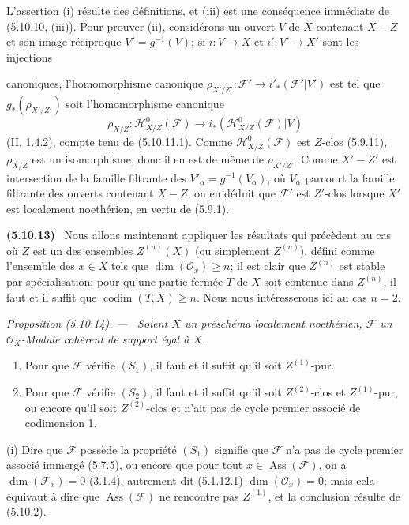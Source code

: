 \documentclass[10pt,oneside]{book}
\newcommand{\oldpage}[2][]{%
  \setcounter{footnote}{0}%
  \marginpar{\scriptsize\textbf{#1}~|~#2}\ignorespaces}
\newenvironment{env}[1][]{\par\medskip\noindent\textbf{(#1)}\ }{\par}
\newenvironment{proposition}[1][]{%
  \par\medskip\noindent\itshape Proposition (#1). ---\ }{\par}
\begin{document}
L'assertion (i) résulte des définitions, et (iii) est une conséquence immédiate
de (5.10.10, (iii)). Pour prouver (ii), considérons un ouvert $V$ de $X$
contenant $X-Z$ et son image réciproque $V'=g^{-1}(V)$; si $i:V\to X$ et
$i':V'\to X'$ sont les injections

\oldpage[IV-2]{119}

canoniques, l'homomorphisme canonique
$\rho_{X'/Z'}:\mathcal F'\to i'_*(\mathcal F'|V')$ est tel que
$g_*(\rho_{X'/Z'})$ soit l'homomorphisme canonique
\[
\rho_{X/Z}:\mathcal H^0_{X/Z}(\mathcal F)
\longrightarrow i_*(\mathcal H^0_{X/Z}(\mathcal F)|V)
\]
(II, 1.4.2), compte tenu de (5.10.11.1). Comme
$\mathcal H^0_{X/Z}(\mathcal F)$ est $Z$-clos (5.9.11), $\rho_{X/Z}$ est un
isomorphisme, donc il en est de même de $\rho_{X'/Z'}$. Comme $X'-Z'$ est
intersection de la famille filtrante des $V'_\alpha=g^{-1}(V_\alpha)$, où
$V_\alpha$ parcourt la famille filtrante des ouverts contenant $X-Z$, on en
déduit que $\mathcal F'$ est $Z'$-clos lorsque $X'$ est localement noethérien,
en vertu de (5.9.1).

\begin{env}[5.10.13]
\label{IV.2.s5.10.13-fr}
Nous allons maintenant appliquer les résultats qui précèdent au cas où $Z$ est
un des ensembles $Z^{(n)}(X)$ (ou simplement $Z^{(n)}$), défini comme
l'ensemble des $x\in X$ tels que $\dim(\mathcal O_x)\geq n$; il est clair que
$Z^{(n)}$ est stable par spécialisation; pour qu'une partie fermée $T$ de $X$
soit contenue dans $Z^{(n)}$, il faut et il suffit que
$\operatorname{codim}(T,X)\geq n$. Nous nous intéresserons ici au cas $n=2$.
\end{env}

\begin{proposition}[5.10.14]
\label{IV.2.s5.10.14-fr}
Soient $X$ un préschéma localement noethérien, $\mathcal F$ un
$\mathcal O_X$-Module cohérent de support égal à $X$.
\begin{enumerate}
\item[(i)] Pour que $\mathcal F$ vérifie $(S_1)$, il faut et il suffit qu'il
soit $Z^{(1)}$-pur.
\item[(ii)] Pour que $\mathcal F$ vérifie $(S_2)$, il faut et il suffit qu'il
soit $Z^{(2)}$-clos et $Z^{(1)}$-pur, ou encore qu'il soit $Z^{(2)}$-clos et
n'ait pas de cycle premier associé de codimension 1.
\end{enumerate}
\end{proposition}

(i) Dire que $\mathcal F$ possède la propriété $(S_1)$ signifie que
$\mathcal F$ n'a pas de cycle premier associé immergé (5.7.5), ou encore que
pour tout $x\in\operatorname{Ass}(\mathcal F)$, on a
$\dim(\mathcal F_x)=0$ (3.1.4), autrement dit (5.1.12.1)
$\dim(\mathcal O_x)=0$; mais cela équivaut à dire que
$\operatorname{Ass}(\mathcal F)$ ne rencontre pas $Z^{(1)}$, et la conclusion
résulte de (5.10.2).
\end{document}
